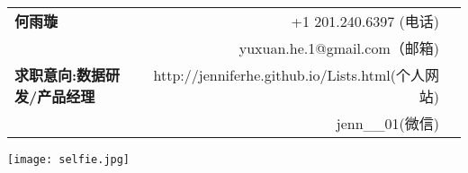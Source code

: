 \documentclass[letterpaper,10pt]{article}
\begin{document}
\noindent\begin{minipage}{0.8\textwidth}%
\begin{tabular}{p{9.3cm}rp{3cm}}
\textbf{\Huge\textbf{何雨璇}}  & \footnotesize{+1 201.240.6397 (电话) }\\[-1ex]
 &  \footnotesize{yuxuan.he.1@gmail.com（邮箱)} \\[-1ex]
 \textbf{ 求职意向:数据研发/产品经理}& \footnotesize{http://jenniferhe.github.io/Lists.html(个人网站)}\\[-1ex]
& \footnotesize{jenn\_\_01(微信)}\\[-1ex]
\end{tabular}
\end{minipage}%
\hfill%
\begin{minipage}{0.17\textwidth}\raggedleft
\texttt{[image: selfie.jpg]}
\hfill%
\end{minipage}



\end{document}
